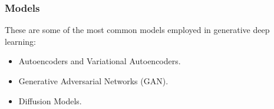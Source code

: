 \begin{frame}
    \frametitle{Models}
    These are some of the most common models employed in generative deep learning:
    \begin{itemize}
        \item Autoencoders and Variational Autoencoders.
        \item Generative Adversarial Networks (GAN).
        \item Diffusion Models.
    \end{itemize}
\end{frame}